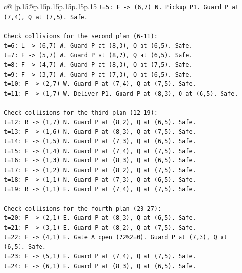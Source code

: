 \documentclass{article}
\begin{document}
{\begin{supertabular}{c@{$\;$}|p{.15\linewidth}@{}p{.15\linewidth}p{.15\linewidth}p{.15\linewidth}p{.15\linewidth}p{.15\linewidth}}
{{{\texttt{t=5: F {-}> (6,7) N. Pickup P1. Guard P at (7,4), Q at (7,5). Safe.} \\
\\ 
\texttt{Check collisions for the second plan (6{-}11):} \\
\texttt{t=6: L {-}> (6,7) W. Guard P at (8,3), Q at (6,5). Safe.} \\
\texttt{t=7: F {-}> (5,7) W. Guard P at (8,2), Q at (6,5). Safe.} \\
\texttt{t=8: F {-}> (4,7) W. Guard P at (8,3), Q at (7,5). Safe.} \\
\texttt{t=9: F {-}> (3,7) W. Guard P at (7,3), Q at (6,5). Safe.} \\
\texttt{t=10: F {-}> (2,7) W. Guard P at (7,4), Q at (7,5). Safe.} \\
\texttt{t=11: F {-}> (1,7) W. Deliver P1. Guard P at (8,3), Q at (6,5). Safe.} \\
\\ 
\texttt{Check collisions for the third plan (12{-}19):} \\
\texttt{t=12: R {-}> (1,7) N. Guard P at (8,2), Q at (6,5). Safe.} \\
\texttt{t=13: F {-}> (1,6) N. Guard P at (8,3), Q at (7,5). Safe.} \\
\texttt{t=14: F {-}> (1,5) N. Guard P at (7,3), Q at (6,5). Safe.} \\
\texttt{t=15: F {-}> (1,4) N. Guard P at (7,4), Q at (7,5). Safe.} \\
\texttt{t=16: F {-}> (1,3) N. Guard P at (8,3), Q at (6,5). Safe.} \\
\texttt{t=17: F {-}> (1,2) N. Guard P at (8,2), Q at (7,5). Safe.} \\
\texttt{t=18: F {-}> (1,1) N. Guard P at (7,3), Q at (6,5). Safe.} \\
\texttt{t=19: R {-}> (1,1) E. Guard P at (7,4), Q at (7,5). Safe.} \\
\\ 
\texttt{Check collisions for the fourth plan (20{-}27):} \\
\texttt{t=20: F {-}> (2,1) E. Guard P at (8,3), Q at (6,5). Safe.} \\
\texttt{t=21: F {-}> (3,1) E. Guard P at (8,2), Q at (7,5). Safe.} \\
\texttt{t=22: F {-}> (4,1) E. Gate A open (22\%2=0). Guard P at (7,3), Q at (6,5). Safe.} \\
\texttt{t=23: F {-}> (5,1) E. Guard P at (7,4), Q at (7,5). Safe.} \\
\texttt{t=24: F {-}> (6,1) E. Guard P at (8,3), Q at (6,5). Safe.} \\
}}}
\end{supertabular}}
\end{document}

